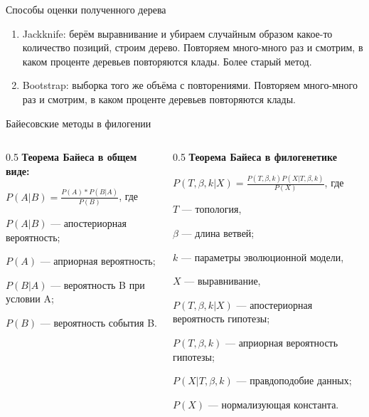 \documentclass[
  ignorenonframetext,
  russian,
]{beamer}
\begin{document}
\begin{frame}{Способы оценки полученного дерева}
\protect{}\label{ux441ux43fux43eux441ux43eux431ux44b-ux43eux446ux435ux43dux43aux438-ux43fux43eux43bux443ux447ux435ux43dux43dux43eux433ux43e-ux434ux435ux440ux435ux432ux430}
\begin{enumerate}
\item
  Jackknife: берём выравнивание и убираем случайным образом какое-то
  количество позиций, строим дерево. Повторяем много-много раз и
  смотрим, в каком проценте деревьев повторяются клады. Более старый
  метод.
\item
  Bootstrap: выборка того же объёма с повторениями. Повторяем
  много-много раз и смотрим, в каком проценте деревьев повторяются
  клады.
\end{enumerate}
\end{frame}

\begin{frame}{Байесовские методы в филогении}
\protect{}\label{ux431ux430ux439ux435ux441ux43eux432ux441ux43aux438ux435-ux43cux435ux442ux43eux434ux44b-ux432-ux444ux438ux43bux43eux433ux435ux43dux438ux438}
\begin{columns}[T]
\begin{column}{0.5\linewidth}
\textbf{Теорема Байеса в общем виде:}

\(P(A | B) = \frac{P(A) * P(B|A)}{P(B)}\), где

\(P(A|B)\) --- апостериорная вероятность;

\(P(A)\) --- априорная вероятность;

\(P(B | A)\) --- вероятность B при условии A;

\(P(B)\) --- вероятность события B.
\end{column}

\begin{column}{0.5\linewidth}
\textbf{Теорема Байеса в филогенетике}

\(P(T, \beta, k|X) = \frac{P(T, \beta, k) P(X | T, \beta, k)}{P(X)}\),
где

\(T\) --- топология,

\(\beta\) --- длина ветвей;

\(k\) --- параметры эволюционной модели,

\(X\) --- выравнивание,

\(P(T, \beta, k|X)\) --- апостериорная вероятность гипотезы;

\(P(T, \beta, k)\) --- априорная вероятность гипотезы;

\(P(X|T, \beta, k)\) --- правдоподобие данных;

\(P(X)\) --- нормализующая константа.
\end{column}
\end{columns}
\end{frame}
\end{document}
